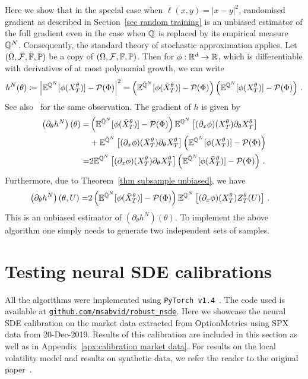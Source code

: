 Here we show that in the special case when $\ell(x,y)= |x - y|^2$, randomised gradient as described in Section~\ref{sec random training} is an unbiased estimator of the full gradient even in the case when $\mathbb{Q}$ is replaced by its empirical measure $\mathbb{Q}^N$. Consequently, the standard theory of stochastic approximation applies. 
Let $(\bar \Omega, \bar {\mathcal{F}}, \bar{\mathbb{F}} ,\bar {\mathbb{P}})$ 
be a copy of $( \Omega, \mathcal{F}, \mathbb{F}, \mathbb{P})$. 
Then for $\phi:\mathbb{R}^d \to \mathbb{R}$, which is differentiable with derivatives of at most polynomial growth, we can write
\[
h^N(\theta)\coloneqq  \left\lvert\mathbb{E}^{\mathbb{Q}^N}[\phi(X_T^{\theta})] - \mathcal{P}(\Phi)\right\rvert^2 
= \left(\mathbb{E}^{ {\bar{\mathbb{Q}}^N}}[\phi(\bar X_T^{\theta})] - \mathcal{P}(\Phi)\right)\left(\mathbb{E}^{\mathbb{Q}^N}[\phi(X_T^{\theta})] - \mathcal{P}(\Phi)\right)\,.
\]
See also~\cite{Cuchiero2020AModels} for the same observation.  The gradient  of $h$ is given by 
\[
\begin{split}
\left(\partial_\theta h^N\right)(\theta)
= & \left(\mathbb{E}^{ {\bar{\mathbb{Q}}^N}}[\phi(\bar X_T^{\theta})] - \mathcal{P}(\Phi)\right)\mathbb{E}^{\mathbb{Q}^N}\left[(\partial_x \phi)(X_T^{\theta}) \partial_\theta X_T^{\theta} \right]  \\
& + \mathbb{E}^{ {\bar{\mathbb{Q}}^N}}\left[(\partial_x\phi)(\bar X_T^{\theta})\partial_\theta \bar X_T^{\theta}\right] \left(\mathbb{E}^{\mathbb{Q}^N}[\phi(X_T^{\theta})] - \mathcal{P}(\Phi)\right) \\
 = & 2 \mathbb{E}^{\mathbb{Q}^N}\left[(\partial_x\phi)(X_T^{\theta})\partial_\theta X_T^{\theta}\right] \left(\mathbb{E}^{\bar{\mathbb{Q}}^N}[\phi(\bar X_T^{\theta})] - \mathcal{P}(\Phi)\right) \,.
\end{split}
\]
Furthermore, due to Theorem~\ref{thm subsample unbiased}, we have 
\[
\begin{split}
\left(\partial_\theta h^N\right)(\theta,U)
 = & 2 \left(\mathbb{E}^{ {\bar{\mathbb{Q}}^N}}[\phi(\bar X_T^{\theta})] - \mathcal{P}(\Phi)\right)\mathbb{E}^{\mathbb{Q}^N}\left[(\partial_x \phi)(X_T^{\theta}) Z_T^{\theta}(U) \right]
\,.
\end{split}
\]
This is an unbiased estimator of $(\partial_\theta h^N)(\theta)$.
To implement the above algorithm one simply needs to generate two independent sets of samples.  

\section{Testing neural SDE calibrations}\label{sec numerics}

All the algorithms were implemented using \texttt{PyTorch v1.4}~\cite{Paszke2017AutomaticPytorch, Paszke2019PyTorch:Library}. The code used is available at \href{https://github.com/msabvid/robust_nsde}{\texttt{github.com/msabvid/robust\_nsde}}.
Here we showcase the neural SDE calibration on the market data extracted from OptionMetrics using SPX data from 20-Dec-2019. 
Results of this calibration are included in this section as well as in Appendix~\ref{apx:calibration market data}. For results on the local volatility model and results on synthetic data, we refer the reader to the original paper~\cite{Gierjatowicz2023RobustEquations}.

